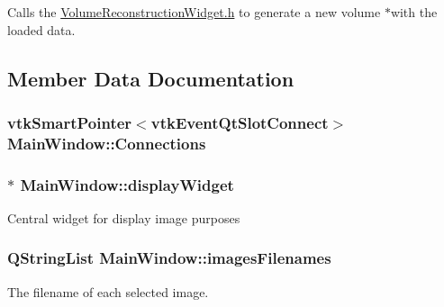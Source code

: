 Calls the \hyperlink{_volume_reconstruction_widget_8h}{Volume\-Reconstruction\-Widget.\-h} to generate a new volume $\ast$with the loaded data. 



\subsection{Member Data Documentation}
\hypertarget{class_main_window_a2581229148c6c597849b827689e58a12}{
\subsubsection[{Connections}]{\setlength{\rightskip}{0pt plus 5cm}vtk\-Smart\-Pointer$<$vtk\-Event\-Qt\-Slot\-Connect$>$ {\bf Main\-Window\-::\-Connections}}}\label{d9/dc6/class_main_window_a2581229148c6c597849b827689e58a12}
\hypertarget{class_main_window_a79daf435968c77e526ddf286bcc86a8f}{
\subsubsection[{display\-Widget}]{$\ast$ {\bf Main\-Window\-::display\-Widget}}}\label{d9/dc6/class_main_window_a79daf435968c77e526ddf286bcc86a8f}
Central widget for display image purposes \hypertarget{class_main_window_a8b33f17919e8e99127a612476aefdaed}{
\subsubsection[{images\-Filenames}]{\setlength{\rightskip}{0pt plus 5cm}Q\-String\-List {\bf Main\-Window\-::images\-Filenames}}}\label{d9/dc6/class_main_window_a8b33f17919e8e99127a612476aefdaed}


The filename of each selected image. 

